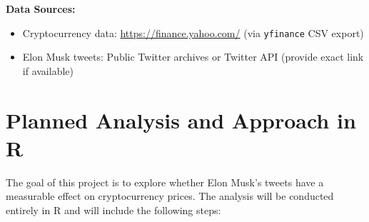 \documentclass[12pt]{article}
\begin{document}
\textbf{Data Sources:}  
\begin{itemize}
    \item Cryptocurrency data: \url{https://finance.yahoo.com/} (via \texttt{yfinance} CSV export)
    \item Elon Musk tweets: Public Twitter archives or Twitter API (provide exact link if available)
\end{itemize}

\section*{Planned Analysis and Approach in R}

The goal of this project is to explore whether Elon Musk's tweets have a measurable effect on cryptocurrency prices. The analysis will be conducted entirely in R and will include the following steps:
\end{document}
